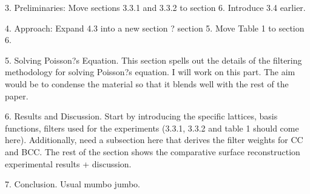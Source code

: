 3. Preliminaries:
Move sections 3.3.1 and 3.3.2 to section 6. Introduce 3.4 earlier. 

4. Approach:
Expand 4.3 into a new section ? section 5. Move Table 1 to section 6.

5. Solving Poisson?s Equation.
This section spells out the details of the filtering methodology for solving Poisson?s equation. I will work on this part. The aim would be to condense the material so that it blends well with the rest of the paper.

6. Results and Discussion.
Start by introducing the specific lattices, basis functions, filters used for the experiments (3.3.1, 3.3.2 and table 1 should come here). Additionally, need a subsection here that derives the filter weights for CC and BCC. The rest of the section shows the comparative surface reconstruction experimental results + discussion.

7. Conclusion.
Usual mumbo jumbo. 
